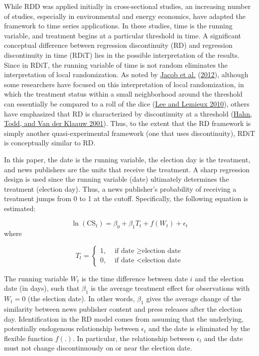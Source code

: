 \documentclass[
]{article}
\begin{document}
While RDD was applied initially in cross-sectional studies, an
increasing number of studies, especially in environmental and energy
economics, have adapted the framework to time series applications. In
these studies, time is the running variable, and treatment begins at a
particular threshold in time. A significant conceptual difference
between regression discontinuity (RD) and regression discontinuity in
time (RDiT) lies in the possible interpretation of the results. Since in
RDiT, the running variable of time is not random eliminates the
interpretation of local randomization. As noted by
\protect\hyperlink{ref-jacob_practical_2012}{Jacob et al.}
(\protect\hyperlink{ref-jacob_practical_2012}{2012}), although some
researchers have focused on this interpretation of local randomization,
in which the treatment status within a small neighborhood around the
threshold can essentially be compared to a roll of the dice
(\protect\hyperlink{ref-lee_regression_2010}{Lee and Lemieux 2010}),
others have emphasized that RD is characterized by discontinuity at a
threshold (\protect\hyperlink{ref-hahn_identification_2001}{Hahn, Todd,
and Van der Klaauw 2001}). Thus, to the extent that the RD framework is
simply another quasi-experimental framework (one that uses
discontinuity), RDiT is conceptually similar to RD.

In this paper, the date is the running variable, the election day is the
treatment, and news publishers are the units that receive the treatment.
A sharp regression design is used since the running variable (date)
ultimately determines the treatment (election day). Thus, a news
publisher's probability of receiving a treatment jumps from 0 to 1 at
the cutoff. Specifically, the following equation is estimated:

\[
\ln(\text{CS}_{t})=\beta_0+\beta_1T_t+f(W_t)+\epsilon_t
\] where

\[
T_t = 
\begin{cases}
1, & \text{ if date } \geq \text{election date} \\
0, & \text{ if date } < \text{election date}
\end{cases}
\]

The running variable \(W_t\) is the time difference between date \(i\)
and the election date (in days), such that \(\beta_1\) is the average
treatment effect for observations with \(W_t = 0\) (the election date).
In other words, \(\beta_1\) gives the average change of the similarity
between news publisher content and press releases after the election
day. Identification in the RD model comes from assuming that the
underlying, potentially endogenous relationship between \(\epsilon_t\)
and the date is eliminated by the flexible function \(f(.)\). In
particular, the relationship between \(\epsilon_t\) and the date must
not change discontinuously on or near the election date.
\end{document}
